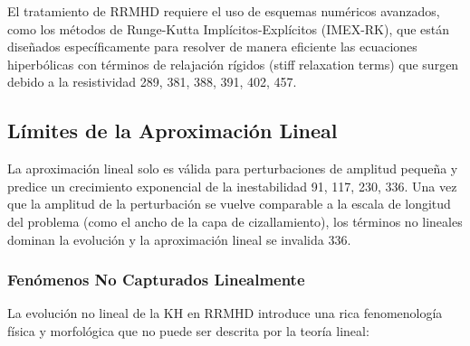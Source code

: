 El tratamiento de RRMHD requiere el uso de esquemas numéricos avanzados, como los métodos de Runge-Kutta Implícitos-Explícitos (IMEX-RK), que están diseñados específicamente para resolver de manera eficiente las ecuaciones hiperbólicas con términos de relajación rígidos (stiff relaxation terms) que surgen debido a la resistividad {289, 381, 388, 391, 402, 457}.

\subsection{Límites de la Aproximación Lineal}

La aproximación lineal solo es válida para perturbaciones de amplitud pequeña y predice un crecimiento exponencial de la inestabilidad {91, 117, 230, 336}. Una vez que la amplitud de la perturbación se vuelve comparable a la escala de longitud del problema (como el ancho de la capa de cizallamiento), los términos no lineales dominan la evolución y la aproximación lineal se invalida {336}.

\subsubsection{Fenómenos No Capturados Linealmente}

La evolución no lineal de la KH en RRMHD introduce una rica fenomenología física y morfológica que no puede ser descrita por la teoría lineal:

